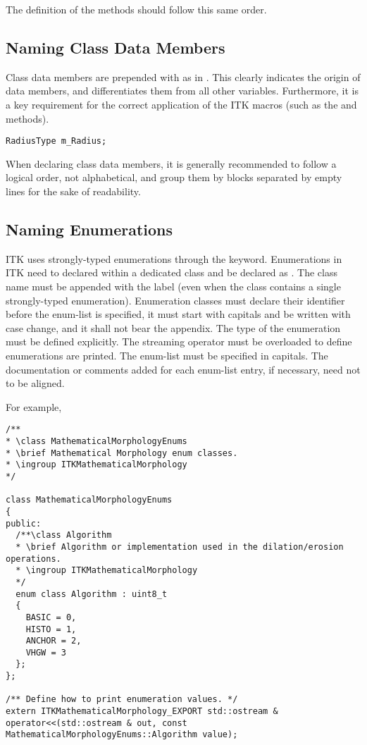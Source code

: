 The definition of the methods should follow this same order.


\subsection{Naming Class Data Members}
\label{NamingClassDataMembers}

Class data members are prepended with  as in . This
clearly indicates the origin of data members, and differentiates them from all
other variables. Furthermore, it is a key requirement for the correct
application of the ITK macros (such as the  and
 methods).
\small
\begin{verbatim}
RadiusType m_Radius;
\end{verbatim}
\normalsize

When declaring class data members, it is generally recommended to follow a
logical order, not alphabetical, and group them by blocks separated by empty
lines for the sake of readability.


\subsection{Naming Enumerations}
\label{subsec:NamingEnums}

ITK uses strongly-typed enumerations through the  keyword.
Enumerations in ITK need to declared within a dedicated class and be declared
as . The class name must be appended with the  label
(even when the class contains a single strongly-typed enumeration). Enumeration
classes must declare their identifier before the enum-list is specified, it
must start with capitals and be written with case change, and it shall not bear
the  appendix. The type of the enumeration must be defined
explicitly. The streaming operator \code{<<} must be overloaded to define
enumerations are printed. The enum-list must be specified in capitals. The
documentation or comments added for each enum-list entry, if necessary, need
not to be aligned.

For example,
\small
\begin{verbatim}
/**
* \class MathematicalMorphologyEnums
* \brief Mathematical Morphology enum classes.
* \ingroup ITKMathematicalMorphology
*/

class MathematicalMorphologyEnums
{
public:
  /**\class Algorithm
  * \brief Algorithm or implementation used in the dilation/erosion operations.
  * \ingroup ITKMathematicalMorphology
  */
  enum class Algorithm : uint8_t
  {
    BASIC = 0,
    HISTO = 1,
    ANCHOR = 2,
    VHGW = 3
  };
};

/** Define how to print enumeration values. */
extern ITKMathematicalMorphology_EXPORT std::ostream &
operator<<(std::ostream & out, const MathematicalMorphologyEnums::Algorithm value);
\end{verbatim}
\normalsize

